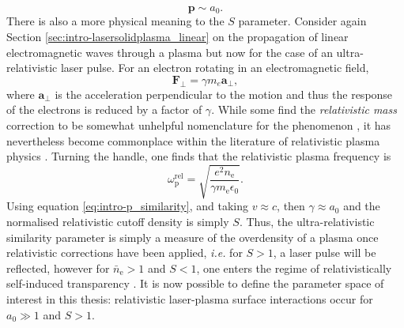 \begin{equation}\label{eq:intro-p_similarity}
	\mathbf{p} \sim a_0.
\end{equation}
There is also a more physical meaning to the $S$ parameter. Consider again Section \ref{sec:intro-lasersolidplasma_linear} on the propagation of linear electromagnetic waves through a plasma but now for the case of an ultra-relativistic laser pulse. For an electron rotating in an electromagnetic field,
\begin{equation}
	\mathbf{F}_\perp = \gamma m_e \mathbf{a}_\perp,
\end{equation}
where $ \mathbf{a}_\perp$ is the acceleration perpendicular to the motion and thus the response of the electrons is reduced by a factor of $\gamma$. While some find the \textit{relativistic mass} correction to be somewhat unhelpful nomenclature for the phenomenon \cite{steaneRelativityMadeRelatively2012}, it has nevertheless become commonplace within the literature of relativistic plasma physics \cite{umstadterRelativisticLaserPlasma2003}. Turning the handle, one finds that the relativistic plasma frequency is
\begin{equation}
	\omega_\mathrm{p}^\mathrm{rel} = \sqrt{\frac{e^2n_\mathrm{e}}{\gamma m_\mathrm{e} \epsilon_0}}.
\end{equation}
Using equation \ref{eq:intro-p_similarity}, and taking $v \approx c$, then $\gamma \approx a_0$ and the normalised relativistic cutoff density is simply $S$. Thus, the ultra-relativistic similarity parameter is simply a measure of the overdensity of a plasma once relativistic corrections have been applied, \textit{i.e.} for $S>1$, a laser pulse will be reflected, however for $\bar{n}_\mathrm{e} > 1$ and $S <1$, one enters the regime of relativistically self-induced transparency \cite{ereminRelativisticSelfInducedTransparency2010}. It is now possible to define the parameter space of interest in this thesis: relativistic laser-plasma surface interactions occur for $a_0 \gg 1$ and $S > 1$.

